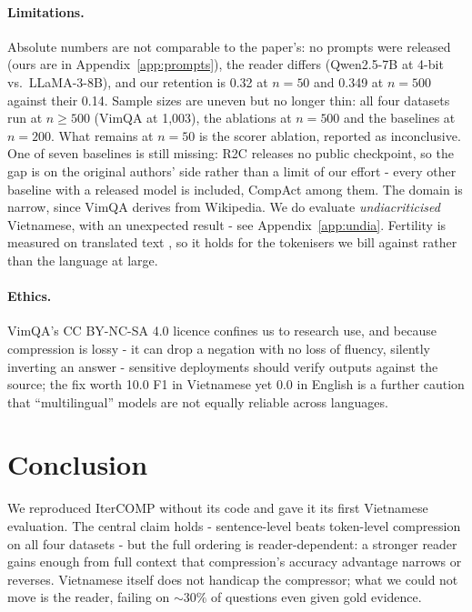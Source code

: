 \documentclass[11pt]{article}
\begin{document}
\paragraph{Limitations.} Absolute numbers are not comparable to the paper's: no
prompts were released (ours are in Appendix~\ref{app:prompts}), the reader differs
(Qwen2.5-7B at 4-bit vs.\ LLaMA-3-8B), and our retention is 0.32 at $n=50$ and 0.349 at $n=500$ against their 0.14.
Sample
sizes are uneven but no longer thin: all four datasets run at
$n\ge500$ (VimQA at 1,003), the ablations at $n=500$ and the baselines at
$n=200$. What remains at $n=50$ is the scorer ablation, reported as
inconclusive. One of seven baselines is still missing: R2C releases no public checkpoint, so
the gap is on the original authors' side rather than a limit of our effort -
every other baseline with a released model is included, CompAct among them. The
domain is narrow,
since VimQA derives from Wikipedia. We do evaluate \emph{undiacriticised} Vietnamese, with
an unexpected result - see Appendix~\ref{app:undia}. Fertility is measured on
translated text \citep{deutsch2025wmt24pp}, so it holds for the tokenisers we
bill against rather than the language at large.

\paragraph{Ethics.} VimQA's CC BY-NC-SA 4.0 licence confines us to research use,
and because compression is lossy - it can drop a negation with no loss of
fluency, silently inverting an answer - sensitive deployments should verify
outputs against the source; the fix worth 10.0 F1 in Vietnamese yet 0.0 in English
is a further caution that ``multilingual'' models are not equally reliable across
languages.

\section{Conclusion}
\label{sec:conclusion}

We reproduced IterCOMP without its code and gave it its first Vietnamese
evaluation. The central claim holds - sentence-level beats
token-level compression on all four datasets - but the full ordering is
reader-dependent: a stronger reader gains enough from full context that
compression's accuracy advantage narrows or reverses. Vietnamese itself does not
handicap the compressor; what we could not move is the reader, failing on
${\sim}30\%$ of questions even given gold evidence.
\end{document}
